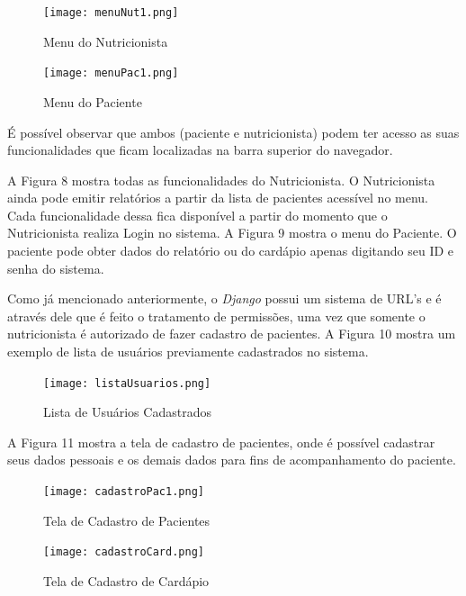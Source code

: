 \documentclass[
	12pt,				%
    oneside,			%
	a4paper,			%
	english,			%
	french,				%
	spanish,			%
	brazil,				%
	]{abntex2}
\begin{document}
\begin{figure} [hbt] 
\label{menuNut} 
\caption{Menu do Nutricionista}
\begin{center}
\texttt{[image: menuNut1.png]}
\end{center}
\end{figure}

\begin{figure} [hbt] 
\label{menuPac} 
\caption{Menu do Paciente}
\begin{center}
\texttt{[image: menuPac1.png]}
\end{center}
\end{figure}

É possível observar que ambos (paciente e nutricionista) podem ter acesso as suas funcionalidades que ficam localizadas
na barra superior do navegador.

A Figura 8 mostra todas as funcionalidades do Nutricionista. O Nutricionista
ainda pode emitir relatórios a partir da lista de pacientes acessível no menu. Cada
funcionalidade dessa fica disponível a partir do momento que o Nutricionista realiza 
Login no sistema. A Figura 9 mostra o menu do Paciente. O paciente pode obter dados
do relatório ou do cardápio apenas digitando seu ID e senha do sistema.

Como já mencionado anteriormente, o \textit{Django} possui um sistema de URL's e é através dele que
é feito o tratamento de permissões, uma vez que somente o nutricionista é autorizado de fazer cadastro
de pacientes. A Figura 10 mostra um exemplo de lista de usuários previamente cadastrados no sistema.

\begin{figure} [hbt]
\label{listUser} 
\caption{Lista de Usuários Cadastrados}
\begin{center}
\texttt{[image: listaUsuarios.png]}
\end{center}
\end{figure}

A Figura 11 mostra a tela de cadastro de pacientes, onde é possível cadastrar
seus dados pessoais e os demais dados para fins de acompanhamento do paciente. 

\begin{figure} [hbt]
\label{cadastroPac} 
\caption{Tela de Cadastro de Pacientes}
\begin{center}
\texttt{[image: cadastroPac1.png]}
\end{center}
\end{figure}

\begin{figure} [hbt]
\label{cadastroCard} 
\caption{Tela de Cadastro de Cardápio}
\begin{center}
\texttt{[image: cadastroCard.png]}
\end{center}
\end{figure}
\end{document}
